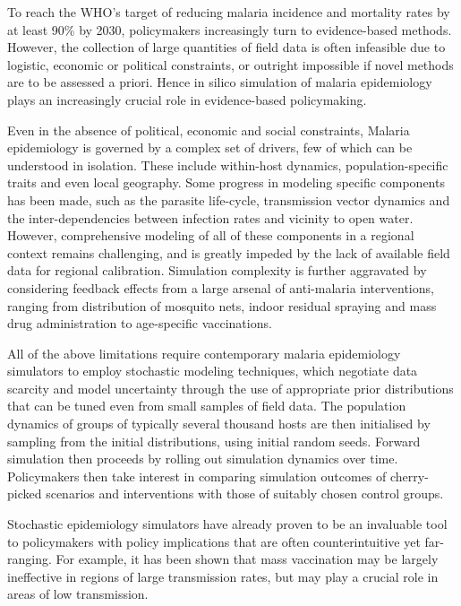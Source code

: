 \documentclass{article}
\begin{document}
To reach the WHO’s target of reducing malaria incidence and mortality rates by at least 90\% by 2030, policymakers increasingly turn to evidence-based methods. 
However, the collection of large quantities of field data is often infeasible due to logistic, economic or political constraints, or outright impossible if novel methods are to be assessed a priori. Hence in silico simulation of malaria epidemiology plays an increasingly crucial role in evidence-based policymaking.

Even in the absence of political, economic and social constraints, Malaria epidemiology is governed by a complex set of drivers, few of which can be understood in isolation. These include within-host dynamics, population-specific traits and even local geography. Some progress in modeling specific components has been made, such as the parasite life-cycle, transmission vector dynamics and the inter-dependencies between infection rates and vicinity to open water. However, comprehensive modeling of all of these components in a regional context remains challenging, and is greatly impeded by the lack of available field data for regional calibration. Simulation complexity is further aggravated by considering feedback effects from a large arsenal of anti-malaria interventions, ranging from distribution of mosquito nets, indoor residual spraying and mass drug administration to age-specific vaccinations. 

All of the above limitations require contemporary malaria epidemiology simulators to employ stochastic modeling techniques, which negotiate data scarcity and model uncertainty through the use of appropriate prior distributions that can be tuned even from small samples of field data. The population dynamics of groups of typically several thousand hosts are then initialised by sampling from the initial distributions, using initial random seeds. Forward simulation then proceeds by rolling out simulation dynamics over time. Policymakers then take interest in comparing simulation outcomes of cherry-picked scenarios and interventions with those of suitably chosen control groups.

Stochastic epidemiology simulators have already proven to be an invaluable tool to policymakers with policy implications that are often counterintuitive yet far-ranging. For example, it has been shown that mass vaccination may be largely ineffective in regions of large transmission rates, but may play a crucial role in areas of low transmission. 
\end{document}
